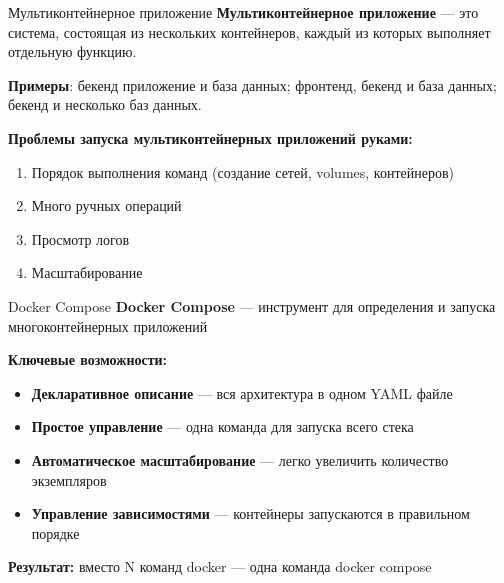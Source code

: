 \documentclass[aspectratio=169]{beamer}
\begin{document}
    \begin{frame}{Мультиконтейнерное приложение}
        \textbf{Мультиконтейнерное приложение} — это система, состоящая из нескольких контейнеров, каждый из которых выполняет
        отдельную функцию.

        \textbf{Примеры}: бекенд приложение и база данных; фронтенд, бекенд и база данных; бекенд и несколько баз данных.

        \textbf{Проблемы запуска мультиконтейнерных приложений руками:}
        \begin{enumerate}
            \item Порядок выполнения команд (создание сетей, volumes, контейнеров)
            \item Много ручных операций
            \item Просмотр логов
            \item Масштабирование
        \end{enumerate}
    \end{frame}

    \begin{frame}{Docker Compose}
        \textbf{Docker Compose} — инструмент для определения и запуска многоконтейнерных приложений

        \vspace{0.2cm}

        \textbf{Ключевые возможности:}
        \begin{itemize}
            \item \textbf{Декларативное описание} — вся архитектура в одном YAML файле
            \item \textbf{Простое управление} — одна команда для запуска всего стека
            \item \textbf{Автоматическое масштабирование} — легко увеличить количество экземпляров
            \item \textbf{Управление зависимостями} — контейнеры запускаются в правильном порядке
        \end{itemize}

        \vspace{0.2cm}

        \textbf{Результат:} вместо N команд docker — одна команда docker compose
    \end{frame}
\end{document}
